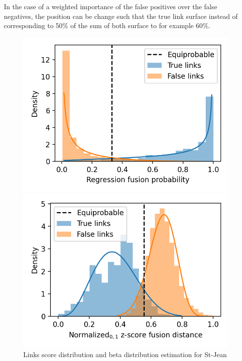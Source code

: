 In the case of a weighted importance of the false positives over the false negatives, the position can be change such that the true link surface instead of corresponding to 50\% of the sum of both surface to for example 60\%.

\begin{figure}
  \caption{Links score distribution and beta distribution estimation for St-Jean}
  \label{fig:links_score_density}

  \label{fig:links_score_density_fusion_regression}
  \includegraphics[width=\linewidth]{img/links_score_density_fusion_regression.png}

  \vspace{0.5cm}

  \label{fig:links_score_density_fusion_z_score}
  \includegraphics[width=\linewidth]{img/links_score_density_fusion_z_score.png}
\end{figure}

